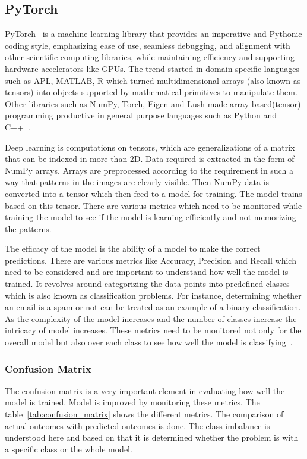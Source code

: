\subsection{PyTorch}
PyTorch~\cite{PyTorch_website} is a machine learning library that provides an imperative and Pythonic coding style, emphasizing ease of use, seamless debugging, and alignment with other scientific computing libraries, while maintaining efficiency and supporting hardware accelerators like GPUs. The trend started in domain specific languages such as APL, MATLAB, R which turned multidimensional arrays (also known as tensors) into objects supported by mathematical primitives to manipulate them. Other libraries such as NumPy, Torch, Eigen and Lush made array-based(tensor) programming productive in general purpose languages such as Python and C++~\cite{pytorch}. 

Deep learning is computations on tensors, which are generalizations of a matrix that can be indexed in more than 2D. Data required is extracted in the form of NumPy arrays. Arrays are preprocessed according to the requirement in such a way that patterns in the images are clearly visible. Then NumPy data is converted into a tensor which then feed to a model for training. The model trains based on this tensor. There are various metrics which need to be monitored while training the model to see if the model is learning efficiently and not memorizing the patterns. 

The efficacy of the model is the ability of a model to make the correct predictions. There are various metrics like Accuracy, Precision and Recall which need to be considered and are important to understand how well the model is trained. It revolves around categorizing the data points into predefined classes which is also known as classification problems. For instance, determining whether an email is a spam or not can be treated as an example of a binary classification. As the complexity of the model increases and the number of classes increase the intricacy of model increases. These metrics need to be monitored not only for the overall model but also over each class to see how well the model is classifying~\cite{Efficacy}. 

\subsubsection{Confusion Matrix}
The confusion matrix is a very important element in evaluating how well the model is trained. Model is improved by monitoring these metrics. The table~\ref{tab:confusion_matrix} shows the different metrics. The comparison of actual outcomes with predicted outcomes is done. The class imbalance is understood here and based on that it is determined whether the problem is with a specific class or the whole model. 

